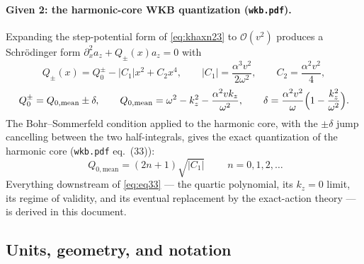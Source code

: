 \documentclass[11pt,a4paper]{article}
\numberwithin{equation}{section}
\theoremstyle{remark}
\newcommand{\kz}{k_z}
\begin{document}
\paragraph{Given 2: the harmonic-core WKB quantization (\texttt{wkb.pdf}).}
Expanding the step-potential form of \eqref{eq:khaxn23} to
$\mathcal{O}(v^2)$ produces a Schr\"odinger form
$\partial_x^2 a_z+Q_\pm(x)a_z=0$ with
\begin{equation}
Q_\pm(x)=Q_0^{\pm}-|C_1|x^2+C_2x^4,\qquad
|C_1|=\frac{\alpha^3v^2}{2\omega^2},\qquad
C_2=\frac{\alpha^2v^2}{4},
\label{eq:wkbQ}
\end{equation}
\begin{equation}
Q_0^\pm = Q_{0,\mathrm{mean}}\pm\delta,\qquad
Q_{0,\mathrm{mean}}=\omega^2-\kz^2-\frac{\alpha^2v\kz}{\omega^2},\qquad
\delta=\frac{\alpha^2v^2}{\omega}\Bigl(1-\frac{\kz^2}{\omega^2}\Bigr).
\label{eq:wkbQ0}
\end{equation}
The Bohr--Sommerfeld condition applied to the harmonic core, with the
$\pm\delta$ jump cancelling between the two half-integrals, gives the exact
quantization of the harmonic core (\texttt{wkb.pdf} eq.~(33)):
\begin{equation}
\boxed{\;Q_{0,\mathrm{mean}}=(2n+1)\sqrt{|C_1|}\;}
\qquad n=0,1,2,\dots
\label{eq:eq33}
\end{equation}
Everything downstream of \eqref{eq:eq33} --- the quartic polynomial, its
$\kz=0$ limit, its regime of validity, and its eventual replacement by the
exact-action theory --- is derived in this document.

\subsection{Units, geometry, and notation}
\label{ssec:units}
\end{document}
